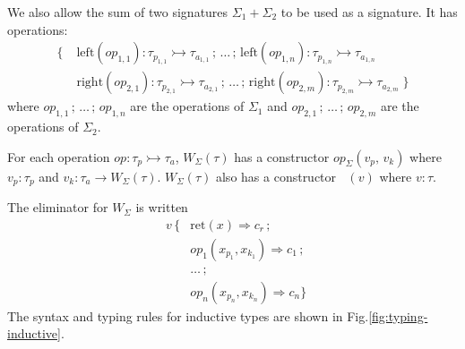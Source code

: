 \documentclass[acmsmall, screen, nonacm]{acmart}
\theoremstyle{definition}
\newcommand{\ind}[1]{W_{#1}}
\newcommand{\indintro}[4]{#2_{#1}(#3,\, #4)}
\newcommand{\retname}{\mathrm{ret}}
\newcommand{\ret}[2]{\mathop{\retname_{#1}}(#2)}
\newcommand{\indelim}[3]{\mathop{\mathrm{rec}_{#1}} #2 \,\{#3\}}
\newcommand{\indretcase}[2]{\retname(#1) \Rightarrow #2}
\newcommand{\indcase}[4]{#1(#2, #3) \Rightarrow #4}
\newcommand{\seq}{\,;\,}
\newcommand{\types}{\mathrel{:}}
\begin{document}
We also allow the sum of two signatures $\Sigma_1 + \Sigma_2$ to be used
as a signature. It has operations:
\begin{align*}
\{ \; &\mathrm{left}(op_{1,1}) \types \tau_{p_{1,1}} \rightarrowtail \tau_{a_{1,1}} \seq
        \ldots \seq
        \mathrm{left}(op_{1, n}) \types \tau_{p_{1, n}} \rightarrowtail \tau_{a_{1, n}} \\
      &\mathrm{right}(op_{2, 1}) \types \tau_{p_{2, 1}} \rightarrowtail \tau_{a_{2,1}} \seq
        \ldots \seq
        \mathrm{right}(op_{2, m}) \types \tau_{p_{2, m}} \rightarrowtail \tau_{a_{2, m}}
        \; \}
\end{align*}
where $op_{1,1} \seq \ldots \seq op_{1,n}$ are the operations of
$\Sigma_1$ and $op_{2,1} \seq \ldots \seq op_{2,m}$ are the operations
of $\Sigma_2$.

For each operation $op \types \tau_p \rightarrowtail \tau_a$,
$\ind{\Sigma}(\tau)$ has a constructor $\indintro{\Sigma}{op}{v_p}{v_k}$
where $v_p \types \tau_p$ and
$v_k \types \tau_a \rightarrow \ind{\Sigma}(\tau)$. $\ind{\Sigma}(\tau)$
also has a constructor $\ret{\Sigma}{v}$ where $v \types \tau$.

The eliminator for $\ind{\Sigma}$ is written
\begin{align*}
\indelim{\Sigma}{v}
  {&\indretcase{x}{c_r} \seq \\
   &\indcase{op_1}{x_{p_1}}{x_{k_1}}{c_1} \seq \\
   &\ldots \seq \\
   &\indcase{op_n}{x_{p_n}}{x_{k_n}}{c_n}}
\end{align*}
The syntax and typing rules for inductive types are shown in
Fig.\ref{fig:typing-inductive}.
\end{document}
